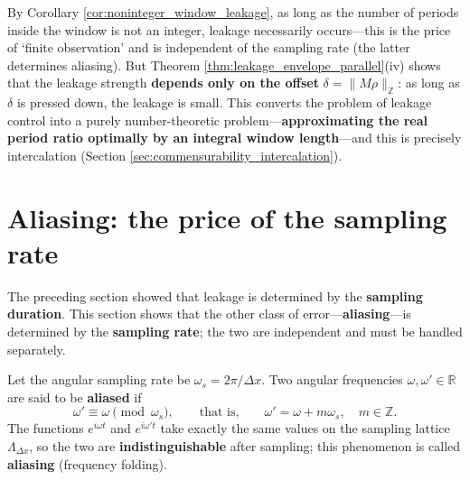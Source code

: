 \begin{remark}\label{rem:leakage_inevitability}
By Corollary \ref{cor:noninteger_window_leakage}, as long as the number of periods inside the window is not an integer, leakage necessarily occurs---this is the price of `finite observation' and is independent of the sampling rate (the latter determines aliasing). But Theorem \ref{thm:leakage_envelope_parallel}(iv) shows that the leakage strength \textbf{depends only on the offset} $\delta=\|M\rho\|_{\mathbb{Z}}$: as long as $\delta$ is pressed down, the leakage is small. This converts the problem of leakage control into a purely number-theoretic problem---\textbf{approximating the real period ratio optimally by an integral window length}---and this is precisely intercalation (Section \ref{sec:commensurability_intercalation}).
\end{remark}

\section{Aliasing: the price of the sampling rate}\label{sec:aliasing}

The preceding section showed that leakage is determined by the \textbf{sampling duration}. This section shows that the other class of error---\textbf{aliasing}---is determined by the \textbf{sampling rate}; the two are independent and must be handled separately.

\begin{definition}[Aliasing]\label{def:aliasing_parallel}
Let the angular sampling rate be $\omega_s=2\pi/\Delta x$. Two angular frequencies $\omega,\omega'\in\mathbb{R}$ are said to be \textbf{aliased} if
\[
\omega'\equiv\omega\pmod{\omega_s},
\qquad\text{that is,}\qquad
\omega'=\omega+m\omega_s,\quad m\in\mathbb{Z}.
\]
The functions $e^{i\omega t}$ and $e^{i\omega' t}$ take exactly the same values on the sampling lattice $\Lambda_{\Delta x}$, so the two are \textbf{indistinguishable} after sampling; this phenomenon is called \textbf{aliasing} (frequency folding).
\end{definition}

